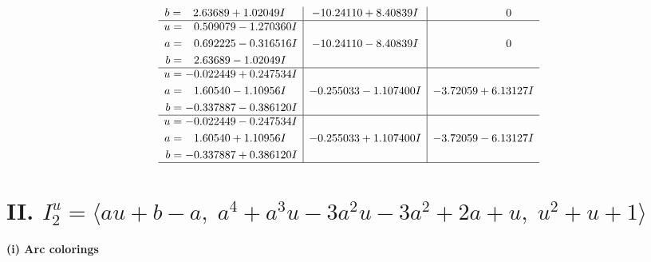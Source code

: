 \documentclass[1p]{elsarticle_modified}
\theoremstyle{definition}
\begin{document}
$$\begin{array}{c|c|c}
\begin{aligned}
b &= \phantom{-}2.63689 + 1.02049 I\end{aligned}
 & -10.24110 + 8.40839 I & \phantom{-0.000000 } 0 \\ \hline\begin{aligned}
u &= \phantom{-}0.509079 - 1.270360 I \\
a &= \phantom{-}0.692225 - 0.316516 I \\
b &= \phantom{-}2.63689 - 1.02049 I\end{aligned}
 & -10.24110 - 8.40839 I & \phantom{-0.000000 } 0 \\ \hline\begin{aligned}
u &= -0.022449 + 0.247534 I \\
a &= \phantom{-}1.60540 - 1.10956 I \\
b &= -0.337887 - 0.386120 I\end{aligned}
 & -0.255033 - 1.107400 I & -3.72059 + 6.13127 I \\ \hline\begin{aligned}
u &= -0.022449 - 0.247534 I \\
a &= \phantom{-}1.60540 + 1.10956 I \\
b &= -0.337887 + 0.386120 I\end{aligned}
 & -0.255033 + 1.107400 I & -3.72059 - 6.13127 I\\
 \hline 
 \end{array}$$\newpage\newpage\renewcommand{\arraystretch}{1}
\centering \section*{II. $I^u_{2}= \langle a u+b- a,\;a^4+a^3 u-3 a^2 u-3 a^2+2 a+u,\;u^2+u+1 \rangle$}
\flushleft \textbf{(i) Arc colorings}\\
\end{document}
